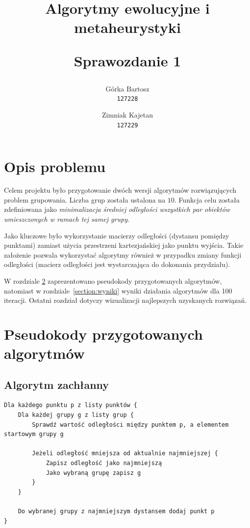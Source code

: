 \documentclass[main.tex]{subfiles}
\begin{document}
\title{
    \textbf{Algorytmy ewolucyjne i metaheurystyki}\\ 
    \begin{large} 
        Sprawozdanie 1
    \end{large}
}

\author{
    Górka Bartosz\\
  \texttt{127228}
  \and
  Zimniak Kajetan\\
  \texttt{127229}
}

\date{}

\maketitle

\section{Opis problemu}
\label{section:opis-problemu}
Celem projektu było przygotowanie dwóch wersji algorytmów rozwiązujących problem grupowania. Liczba grup została ustalona na $10$. Funkcja celu została zdefiniowana jako \textit{minimalizacja średniej odległości wszystkich par obiektów umieszczonych w ramach tej samej grupy}.

Jako kluczowe było wykorzystanie macierzy odległości (dystansu pomiędzy punktami) zamiast użycia przestrzeni kartezjańskiej jako punktu wyjścia. Takie założenie pozwala wykorzystać algorytmy również w przypadku zmiany funkcji odległości (macierz odległości jest wystarczająca do dokonania przydziału).

W rozdziale \ref{section:pseudokody} zaprezentowano pseudokody przygotowanych algorytmów, natomiast w rozdziale\leavevmode\nobreak\ \ref{section:wyniki} wyniki działania algorytmów dla 100 iteracji. Ostatni rozdział dotyczy wizualizacji najlepszych uzyskanych rozwiązań.

\section{Pseudokody przygotowanych algorytmów}
\label{section:pseudokody}
\subsection{Algorytm zachłanny}
\begin{verbatim}
Dla każdego punktu p z listy punktów {
    Dla każdej grupy g z listy grup {
        Sprawdź wartość odległości między punktem p, a elementem startowym grupy g
        
        Jeżeli odległość mniejsza od aktualnie najmniejszej {
            Zapisz odległość jako najmniejszą
            Jako wybraną grupę zapisz g
        }
    }

    Do wybranej grupy z najmniejszym dystansem dodaj punkt p
}
\end{verbatim}
\end{document}
